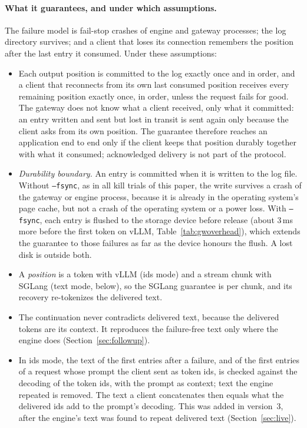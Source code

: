 \documentclass[10pt,twocolumn]{article}
\begin{document}
\paragraph{What it guarantees, and under which assumptions.} The failure
model is fail-stop crashes of engine and gateway processes; the log directory
survives; and a client that loses its connection remembers the position
after the last entry it consumed. Under these assumptions:
\begin{itemize}
  \item Each output position is committed to the log exactly once and in
    order, and a client that reconnects from its own last consumed position
    receives every remaining position exactly once, in order, unless the
    request fails for good. The gateway does not know what a client received,
    only what it committed: an entry written and sent but lost in transit is
    sent again only because the client asks from its own position. The
    guarantee therefore reaches an application end to end only if the client
    keeps that position durably together with what it consumed; acknowledged
    delivery is not part of the protocol.
  \item \emph{Durability boundary.} An entry is committed when it is written to
    the log file. Without \texttt{--fsync}, as in all kill trials of this paper,
    the write survives a crash of the gateway or engine process, because it is
    already in the operating system's page cache, but not a crash of the
    operating system or a power loss. With \texttt{--fsync}, each entry is
    flushed to the storage device before release (about 3\,ms more before the
    first token on vLLM, Table~\ref{tab:gwoverhead}), which extends the
    guarantee to those failures as far as the device honours the flush. A lost
    disk is outside both.
  \item A \emph{position} is a token with vLLM (ids mode) and a stream chunk
    with SGLang (text mode, below), so the SGLang guarantee is per chunk, and
    its recovery re-tokenizes the delivered text.
  \item The continuation never contradicts delivered text, because the
    delivered tokens are its context. It reproduces the failure-free text only
    where the engine does (Section~\ref{sec:followup}).
  \item In ids mode, the text of the first entries after a failure, and of
    the first entries of a request whose prompt the client sent as token ids,
    is checked against the decoding of the token ids, with the prompt as
    context; text the engine repeated is removed. The text a client
    concatenates then equals what the delivered ids add to the prompt's
    decoding. This was added in version~3, after the engine's text was found
    to repeat delivered text (Section~\ref{sec:live}).
\end{itemize}
\end{document}
